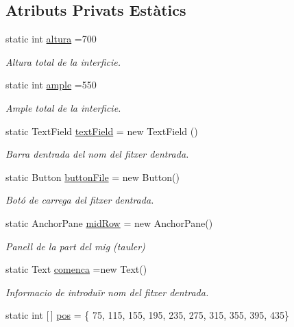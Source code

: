 \subsection*{Atributs Privats Estàtics}
\begin{DoxyCompactItemize}
\item 
static int \mbox{\hyperlink{class_gui_ad7509c136ef1dcfbc543aa3329ddfd9d}{altura}} =700
\begin{DoxyCompactList}\small\item\em Altura total de la interficie. \end{DoxyCompactList}\item 
static int \mbox{\hyperlink{class_gui_a872c30141e879159a1c3d9958918fecd}{ample}} =550
\begin{DoxyCompactList}\small\item\em Ample total de la interficie. \end{DoxyCompactList}\item 
static Text\+Field \mbox{\hyperlink{class_gui_aea36e0a7ecf10d53fa60708f54f36015}{text\+Field}} = new Text\+Field ()
\begin{DoxyCompactList}\small\item\em Barra d\textquotesingle{}entrada del nom del fitxer d\textquotesingle{}entrada. \end{DoxyCompactList}\item 
static Button \mbox{\hyperlink{class_gui_a2f3232db85811350d923ff914cc0ac27}{button\+File}} = new Button()
\begin{DoxyCompactList}\small\item\em Botó de carrega del fitxer d\textquotesingle{}entrada. \end{DoxyCompactList}\item 
static Anchor\+Pane \mbox{\hyperlink{class_gui_adc1aff892600f520ce657dbf0d50d641}{mid\+Row}} = new Anchor\+Pane()
\begin{DoxyCompactList}\small\item\em Panell de la part del mig (tauler) \end{DoxyCompactList}\item 
static Text \mbox{\hyperlink{class_gui_ac9724d96aa5ea5830fefb2a29e6193d5}{comenca}} =new Text()
\begin{DoxyCompactList}\small\item\em Informacio de introduïr nom del fitxer d\textquotesingle{}entrada. \end{DoxyCompactList}\item 
static int \mbox{[}$\,$\mbox{]} \mbox{\hyperlink{class_gui_abed40e74a4b6d812ce886e19e652df89}{pos}} = \{ 75, 115, 155, 195, 235, 275, 315, 355, 395, 435\}

\end{DoxyCompactItemize}
